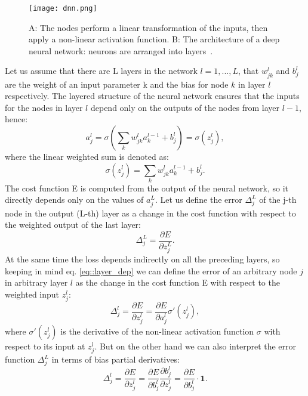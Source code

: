 \begin{figure}[htpb]
	\centering
	\texttt{[image: dnn.png]}
	\caption{A: The nodes perform a linear transformation of the inputs, then apply a non-linear activation function. B: The architecture of a deep neural network: neurons are arranged into layers~\cite{dnn1}. }
	\label{fig::dnn}
\end{figure}
Let us assume that there are L layers in the network $l=1,...,L$, that $w^l_{jk}$ and $b^l_j$ are the weight of an input parameter k and the bias for node $k$ in layer $l$ respectively. The layered structure of the neural network ensures that the inputs for the nodes in layer $l$ depend only on the outputs of the nodes from layer $l-1$, hence:
\begin{equation}
\label{eq::layer_dep}
a^l_j=\sigma\left(\sum_k w^l_{jk}a^{l-1}_k + b_j^l \right) = \sigma(z^l_j),
\end{equation}
where the linear weighted sum is denoted as:
\begin{equation}
\sigma(z^l_j)=\sum_k w^l_{jk}a^{l-1}_k + b_j^l.
\end{equation}
The cost function E is computed from the output of the neural network, so it directly depends only on the values of $a_j^L$. Let us define the error $\Delta_j^L$ of the j-th node in the output (L-th) layer as a change in the cost function with respect to the weighted output of the last layer:
\begin{equation}
\label{eq::bp1}
\Delta^L_j=\frac{\partial E}{\partial z_j^L}.
\end{equation}
At the same time the loss depends indirectly on all the preceding layers, so keeping in mind eq. \ref{eq::layer_dep} we can define the error of an arbitrary node $j$ in arbitrary layer $l$ as the change in the cost function E with respect to the weighted input $z^l_j$:
\begin{equation}
\Delta^l_j=\frac{\partial E}{\partial z_j^l}=\frac{\partial E}{\partial a^l_j}\sigma'(z^l_j),
\end{equation}
where $\sigma'(z^l_j)$ is the derivative of the non-linear activation function $\sigma$ with respect to its input at $z^l_j$. But on the other hand we can also interpret the error function  $\Delta^L_j$ in terms of bias partial derivatives:
\begin{equation}
\label{eq::bp2}
\Delta^l_j=\frac{\partial E}{\partial z_j^l}=\frac{\partial E}{\partial b^l_j}\frac{\partial b_j^l}{\partial z_j^l}=\frac{\partial E}{\partial b^l_j}\cdot \textbf{1}.
\end{equation}
